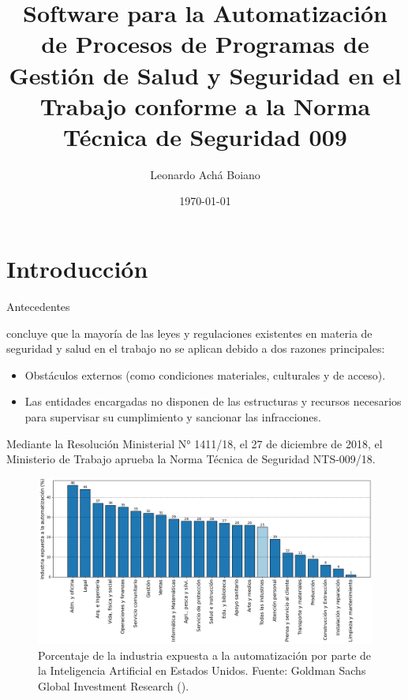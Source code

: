 \documentclass[spanish]{beamer} %
\title{Software para la Automatización de Procesos de Programas de Gestión de Salud y Seguridad 
en el Trabajo conforme a la Norma Técnica de Seguridad 009}
\date{\today}
\author{Leonardo Achá Boiano}
\institute{Universidad Católica Boliviana ``San Pablo''}
\begin{document}
\maketitle
  
\section{Introducción}
\begin{frame}[allowframebreaks]{Antecedentes}

  \textcite{cervantesdiagnostico} concluye que la mayoría de las leyes y regulaciones existentes en materia de seguridad y salud en el trabajo no se aplican debido a dos razones principales: 
  \begin{itemize}
    \item Obstáculos externos (como condiciones materiales, culturales y de acceso).
    \item Las entidades encargadas no disponen de las estructuras y recursos necesarios para supervisar su cumplimiento y sancionar las infracciones.
  \end{itemize}
  

  Mediante la Resolución Ministerial N° 1411/18, el 27 de diciembre de 2018, el Ministerio de Trabajo aprueba la Norma Técnica de Seguridad NTS-009/18.

  \framebreak

    \begin{figure}
        \centering
        \includegraphics[width=\textwidth, height=.58\textheight]{../images/marcoref/share_of_industry_exposed_to_automation_ai.png}
        \caption{Porcentaje de la industria expuesta a la automatización por parte de la Inteligencia Artificial en Estados Unidos. Fuente: Goldman Sachs Global Investment Research (\citeyear{hatzius2023potentially}).}
        \label{fig:share_of_industry_exposed_to_automation_ai_gs}
    \end{figure}
    

\end{frame}
\end{document}
